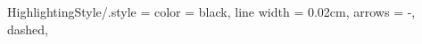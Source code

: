 
\tikzset
{
	HighlightingStyle/.style =
	{
		color				= black,	%
		line width			= 0.02cm,			%
		arrows				= -,				%
		dashed,
	}
}	%
